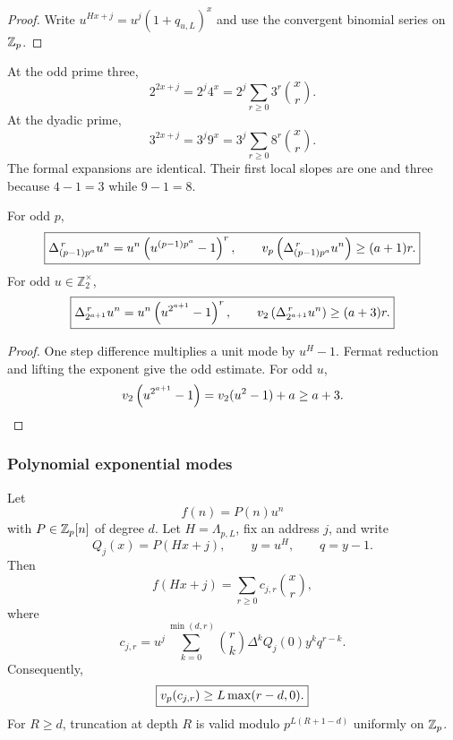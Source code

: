 \begin{proof}
Write \(u^{Hx+j}=u^j(1+q_{u,L})^x\) and use the convergent binomial series on \(\mathbb Z_p\).
\end{proof}

\begin{histexample}\label{hist:ex:paired_unit_expansions}
At the odd prime three,
\[
2^{2x+j}
=
2^j4^x
=
2^j\sum_{r\geq0}3^r\binom xr.
\]
At the dyadic prime,
\[
3^{2x+j}
=
3^j9^x
=
3^j\sum_{r\geq0}8^r\binom xr.
\]
The formal expansions are identical. Their first local slopes are one and three because \(4-1=3\) while \(9-1=8\).
\end{histexample}

\begin{histcorollary}\label{hist:cor:basic_local_difference_gains}
For odd \(p\),
\[
\boxed{
\Delta_{(p-1)p^a}^{\,r}u^n
=
u^n\left(u^{(p-1)p^a}-1\right)^r,
\qquad
v_p\left(\Delta_{(p-1)p^a}^{\,r}u^n\right)\geq(a+1)r.
}
\]
For odd \(u\in\mathbb Z_2^\times\),
\[
\boxed{
\Delta_{2^{a+1}}^{\,r}u^n
=
u^n\left(u^{2^{a+1}}-1\right)^r,
\qquad
v_2\left(\Delta_{2^{a+1}}^{\,r}u^n\right)\geq(a+3)r.
}
\]
\end{histcorollary}

\begin{proof}
One step difference multiplies a unit mode by \(u^H-1\). Fermat reduction and lifting the exponent give the odd estimate. For odd \(u\),
\[
v_2\left(u^{2^{a+1}}-1\right)
=
v_2(u^2-1)+a
\geq a+3.
\]
\end{proof}

\subsubsection{Polynomial exponential modes}

\begin{histtheorem}\label{hist:thm:polynomial_exponential_mahler}
Let
\[
f(n)=P(n)u^n
\]
with \(P\in\mathbb Z_p[n]\) of degree \(d\). Let \(H=\Lambda_{p,L}\), fix an address \(j\), and write
\[
Q_j(x)=P(Hx+j),
\qquad
y=u^H,
\qquad q=y-1.
\]
Then
\[
\boxed{
f(Hx+j)=\sum_{r\geq0}c_{j,r}\binom xr,
}
\]
where
\[
\boxed{
c_{j,r}
=
u^j
\sum_{k=0}^{\min(d,r)}
\binom rk
\Delta^kQ_j(0)y^kq^{r-k}.
}
\]
Consequently,
\[
\boxed{
v_p(c_{j,r})\geq L\max(r-d,0).
}
\]
For \(R\geq d\), truncation at depth \(R\) is valid modulo \(p^{L(R+1-d)}\) uniformly on \(\mathbb Z_p\).
\end{histtheorem}

